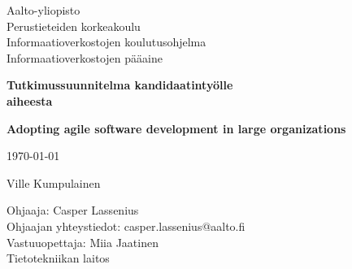 \begin{titlepage}

	\begin{flushleft}
	\begin{minipage}{15cm}
		\linespread{1.0}\small
		Aalto-yliopisto \\
		Perustieteiden korkeakoulu \\
		Informaatioverkostojen koulutusohjelma \\
		Informaatioverkostojen pääaine
		\par
	\end{minipage}
	\end{flushleft}
	\centering
	\vspace{1.5cm}
	{\large\bfseries Tutkimussuunnitelma kandidaatintyölle \\ aiheesta \par}
	{\LARGE\bfseries Adopting agile software development in large organizations\par}
	\vspace{1.5cm}
	{\large \today\par}
	{\Large Ville Kumpulainen \par}
	\vfill

	\begin{flushleft}
	\begin{minipage}{15cm}
		\linespread{1.0}\small
		Ohjaaja: Casper Lassenius \\
		Ohjaajan yhteystiedot: casper.lassenius@aalto.fi \\
		Vastuuopettaja: Miia Jaatinen \\
		Tietotekniikan laitos
		\par
	\end{minipage}
	\end{flushleft}


\end{titlepage}
